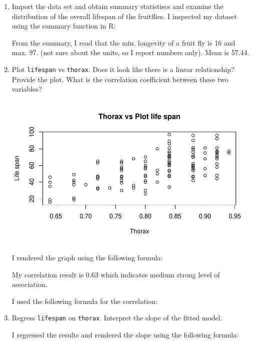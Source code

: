 \documentclass[12pt,letterpaper]{article}
\begin{document}
\begin{enumerate}
	
	\item
	Import the data set and obtain summary statistiscs and examine the distribution of the overall lifespan of the fruitflies.  
	I inspected my dataset using the summary function in R:
	
	From the summary, I read that the min. longevity of a fruit fly is 16 and max. 97. (not sure about the units, so I report numbers only). Mean is 57.44. 
\vspace{1cm}
	\item
	Plot \texttt{lifespan} vs \texttt{thorax}. Does it look like there is a linear relationship? Provide the plot. What is the correlation coefficient between these two variables?
	
	\includegraphics{Rplot01}
	
	I rendered the graph using the following formula:
	
	
	My correlation result is 0.63 which indicates medium strong level of association.
	
	I used the following formula for the correlation:
	
	
	\item
	Regress \texttt{lifespan} on \texttt{thorax}.  Interpret the slope of the fitted model.
			\vspace{1cm}
			
	I regressed the results and rendered the slope using the following formula: 
	
	

\end{enumerate}
\end{document}
